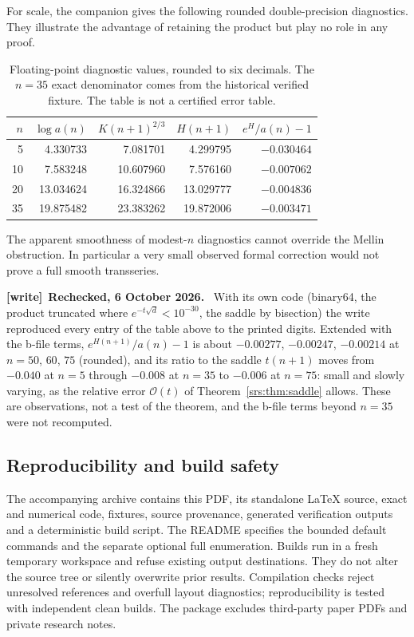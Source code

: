 \documentclass[11pt]{article}
\numberwithin{equation}{section}
\theoremstyle{remark}\newtheorem{remark}[theorem]{Remark}
\newcommand{\Oh}{\mathcal O}
\newenvironment{writenote}[1][]{\par\smallskip\begingroup\small
 \noindent\textbf{[write]}\if\relax\detokenize{#1}\relax\else~\textbf{#1.}\fi\ }%
 {\par\endgroup\smallskip}
\begin{document}
For scale, the companion gives the following rounded double-precision diagnostics. They illustrate the advantage of retaining the product but play no role in any proof.
\begin{table}[H]
\centering\small
\begin{tabular}{@{}r r r r r@{}}\toprule
$n$ & $\log a(n)$ & $K(n+1)^{2/3}$ & $H(n+1)$ & $e^{H}/a(n)-1$\\\midrule
5 & 4.330733 & 7.081701 & 4.299795 & $-0.030464$\\
10 & 7.583248 & 10.607960 & 7.576160 & $-0.007062$\\
20 & 13.034624 & 16.324866 & 13.029777 & $-0.004836$\\
35 & 19.875482 & 23.383262 & 19.872006 & $-0.003471$\\\bottomrule
\end{tabular}
\caption{Floating-point diagnostic values, rounded to six decimals. The $n=35$ exact denominator comes from the historical verified fixture. The table is not a certified error table.}
\end{table}
The apparent smoothness of modest-$n$ diagnostics cannot override the Mellin obstruction. In particular a very small observed formal correction would not prove a full smooth transseries.

\begin{writenote}[Rechecked, 6 October 2026]
With its own code (binary64, the product truncated where
$e^{-t\sqrt d}<10^{-30}$, the saddle by bisection) the write reproduced every
entry of the table above to the printed digits. Extended with the b-file
terms, $e^{H(n+1)}/a(n)-1$ is about $-0.00277$, $-0.00247$, $-0.00214$ at
$n=50$, $60$, $75$ (rounded), and its ratio to the saddle $t(n+1)$ moves
from $-0.040$ at $n=5$ through $-0.008$ at $n=35$ to $-0.006$ at $n=75$:
small and slowly varying, as the relative error $\Oh(t)$ of
Theorem~\ref{srs:thm:saddle} allows. These are observations, not a test of
the theorem, and the b-file terms beyond $n=35$ were not recomputed.
\end{writenote}

\subsection{Reproducibility and build safety}
The accompanying archive contains this PDF, its standalone \LaTeX{} source, exact and numerical code, fixtures, source provenance, generated verification outputs and a deterministic build script. The README specifies the bounded default commands and the separate optional full enumeration. Builds run in a fresh temporary workspace and refuse existing output destinations. They do not alter the source tree or silently overwrite prior results. Compilation checks reject unresolved references and overfull layout diagnostics; reproducibility is tested with independent clean builds. The package excludes third-party paper PDFs and private research notes.
\end{document}
